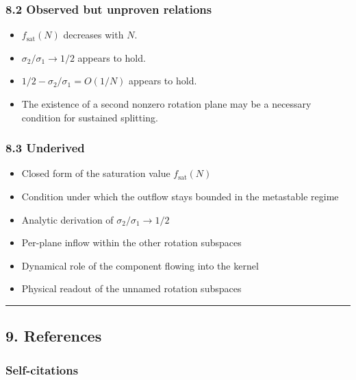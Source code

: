 \documentclass[
  a4paper,
]{article}
\providecommand{\tightlist}{%
  \setlength{\itemsep}{0pt}\setlength{\parskip}{0pt}}
\begin{document}
\subsubsection{8.2 Observed but unproven
relations}\label{observed-but-unproven-relations}

\begin{itemize}
\tightlist
\item
  \(f_{\mathrm{sat}}(N)\) decreases with \(N\).
\item
  \(\sigma_2/\sigma_1\to1/2\) appears to hold.
\item
  \(1/2-\sigma_2/\sigma_1=O(1/N)\) appears to hold.
\item
  The existence of a second nonzero rotation plane may be a necessary
  condition for sustained splitting.
\end{itemize}

\subsubsection{8.3 Underived}\label{underived}

\begin{itemize}
\tightlist
\item
  Closed form of the saturation value \(f_{\mathrm{sat}}(N)\)
\item
  Condition under which the outflow stays bounded in the metastable
  regime
\item
  Analytic derivation of \(\sigma_2/\sigma_1\to1/2\)
\item
  Per-plane inflow within the other rotation subspaces
\item
  Dynamical role of the component flowing into the kernel
\item
  Physical readout of the unnamed rotation subspaces
\end{itemize}

\begin{center}\rule{0.5\linewidth}{0.5pt}\end{center}

\subsection{9. References}\label{references}

\subsubsection{Self-citations}\label{self-citations}
\end{document}
